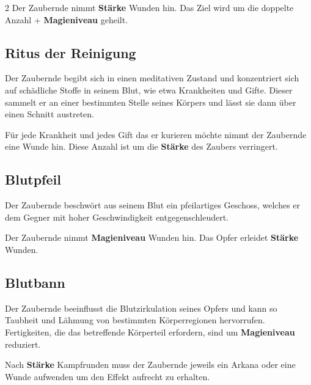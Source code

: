 \begin{multicols*}{2}
Der Zaubernde nimmt \textbf{Stärke} Wunden hin. Das Ziel wird um die doppelte Anzahl + \textbf{Magieniveau} geheilt.



\subsection{Ritus der Reinigung}

Der Zaubernde begibt sich in einen meditativen Zustand und konzentriert sich auf schädliche Stoffe in seinem Blut, wie etwa Krankheiten und Gifte. Dieser sammelt er an einer bestimmten Stelle seines Körpers und lässt sie dann über einen Schnitt austreten.

Für jede Krankheit und jedes Gift das er kurieren möchte nimmt der Zaubernde eine Wunde hin. Diese Anzahl ist um die \textbf{Stärke} des Zaubers verringert.



\subsection{Blutpfeil}

Der Zaubernde beschwört aus seinem Blut ein pfeilartiges Geschoss, welches er dem Gegner mit hoher Geschwindigkeit entgegenschleudert.

Der Zaubernde nimmt \textbf{Magieniveau} Wunden hin. Das Opfer erleidet \textbf{Stärke} Wunden.



\subsection{Blutbann}

Der Zaubernde beeinflusst die Blutzirkulation seines Opfers und kann so Taubheit und Lähmung von bestimmten Körperregionen hervorrufen. Fertigkeiten, die das betreffende Körperteil erfordern, sind um \textbf{Magieniveau} reduziert.

Nach \textbf{Stärke} Kampfrunden muss der Zaubernde jeweils ein Arkana oder eine Wunde aufwenden um den Effekt aufrecht zu erhalten.




\end{multicols*}
